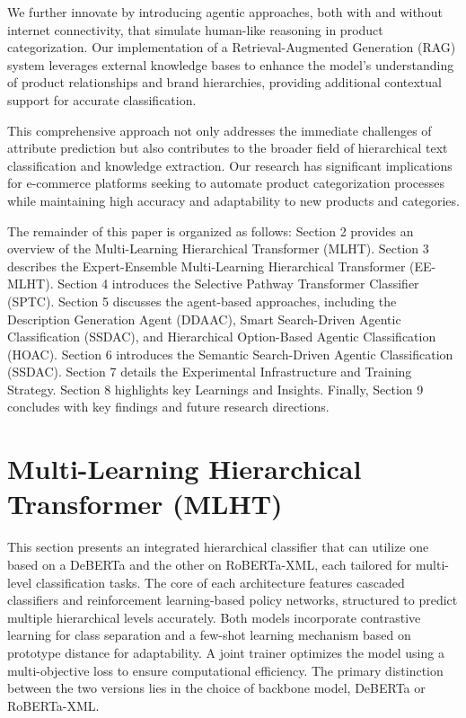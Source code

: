\documentclass[9pt,a4paper,twoside]{rho-class/rho}
\begin{document}
    We further innovate by introducing agentic approaches, both with and without internet connectivity, that simulate human-like reasoning in product categorization. Our implementation of a Retrieval-Augmented Generation (RAG) system leverages external knowledge bases to enhance the model's understanding of product relationships and brand hierarchies, providing additional contextual support for accurate classification.
    
    This comprehensive approach not only addresses the immediate challenges of attribute prediction but also contributes to the broader field of hierarchical text classification and knowledge extraction. Our research has significant implications for e-commerce platforms seeking to automate product categorization processes while maintaining high accuracy and adaptability to new products and categories.
    
    The remainder of this paper is organized as follows: Section 2 provides an overview of the Multi-Learning Hierarchical Transformer (MLHT). Section 3 describes the Expert-Ensemble Multi-Learning Hierarchical Transformer (EE-MLHT). Section 4 introduces the Selective Pathway Transformer Classifier (SPTC). Section 5 discusses the agent-based approaches, including the Description Generation Agent (DDAAC), Smart Search-Driven Agentic Classification (SSDAC), and Hierarchical Option-Based Agentic Classification (HOAC). Section 6 introduces the Semantic Search-Driven Agentic Classification (SSDAC). Section 7 details the Experimental Infrastructure and Training Strategy. Section 8 highlights key Learnings and Insights. Finally, Section 9 concludes with key findings and future research directions.

\section{Multi-Learning Hierarchical Transformer (MLHT)}

   This section presents an integrated hierarchical classifier that can utilize one based on a DeBERTa and the other on RoBERTa-XML, each tailored for multi-level classification tasks. The core of each architecture features cascaded classifiers and reinforcement learning-based policy networks, structured to predict multiple hierarchical levels accurately. Both models incorporate contrastive learning for class separation and a few-shot learning mechanism based on prototype distance for adaptability. A joint trainer optimizes the model using a multi-objective loss to ensure computational efficiency. The primary distinction between the two versions lies in the choice of backbone model, DeBERTa or RoBERTa-XML.
\end{document}
